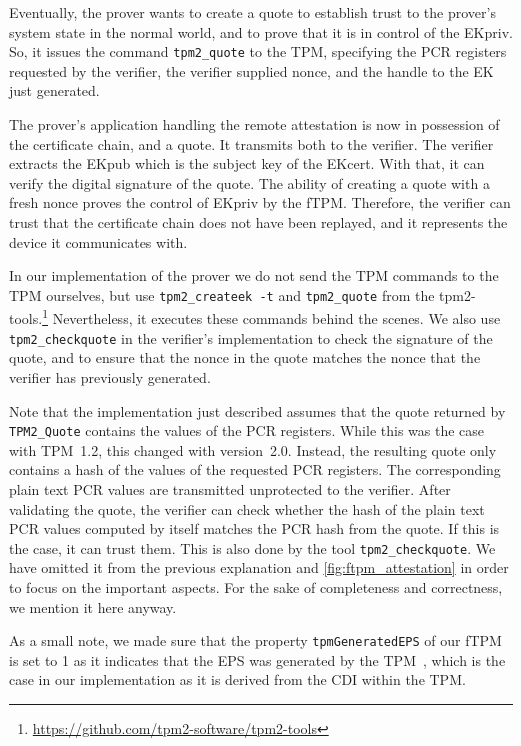 Eventually, the prover wants to create a quote to establish trust to the prover's system state in the normal world, and to prove that it is in control of the EKpriv.
So, it issues the command \texttt{tpm2\_quote} to the TPM, specifying the PCR registers requested by the verifier, the verifier supplied nonce, and the handle to the EK just generated.

The prover's application handling the remote attestation is now in possession of the certificate chain, and a quote.
It transmits both to the verifier.
The verifier extracts the EKpub which is the subject key of the EKcert.
With that, it can verify the digital signature of the quote.
The ability of creating a quote with a fresh nonce proves the control of EKpriv by the fTPM\@.
Therefore, the verifier can trust that the certificate chain does not have been replayed, and it represents the device it communicates with.

In our implementation of the prover we do not send the TPM commands to the TPM ourselves, but use \texttt{tpm2\_createek~-t} and \texttt{tpm2\_quote} from the tpm2-tools.\footnote{\url{https://github.com/tpm2-software/tpm2-tools}}
Nevertheless, it executes these commands behind the scenes.
We also use \texttt{tpm2\_checkquote} in the verifier's implementation to check the signature of the quote, and to ensure that the nonce in the quote matches the nonce that the verifier has previously generated.

Note that the implementation just described assumes that the quote returned by \texttt{TPM2\_Quote} contains the values of the PCR registers.
While this was the case with TPM~1.2, this changed with version~2.0.
Instead, the resulting quote only contains a hash of the values of the requested PCR registers.
The corresponding plain text PCR values are transmitted unprotected to the verifier.
After validating the quote, the verifier can check whether the hash of the plain text PCR values computed by itself matches the PCR hash from the quote.
If this is the case, it can trust them.
This is also done by the tool \texttt{tpm2\_checkquote}.
We have omitted it from the previous explanation and \autoref{fig:ftpm_attestation} in order to focus on the important aspects.
For the sake of completeness and correctness, we mention it here anyway.

As a small note, we made sure that the property \texttt{tpmGeneratedEPS} of our fTPM is set to 1 as it indicates that the EPS was generated by the TPM~\cite{tpm}, which is the case in our implementation as it is derived from the CDI within the TPM\@.


